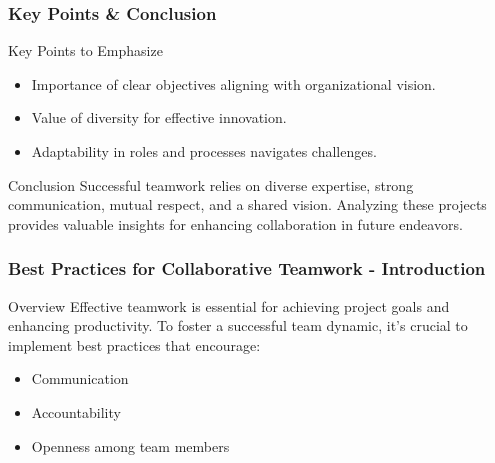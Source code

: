 \documentclass[aspectratio=169]{beamer}
\begin{document}
\begin{frame}[fragile]
    \frametitle{Key Points & Conclusion}
    \begin{block}{Key Points to Emphasize}
        \begin{itemize}
            \item Importance of clear objectives aligning with organizational vision.
            \item Value of diversity for effective innovation.
            \item Adaptability in roles and processes navigates challenges.
        \end{itemize}
    \end{block}

    \begin{block}{Conclusion}
        Successful teamwork relies on diverse expertise, strong communication, mutual respect, and a shared vision. Analyzing these projects provides valuable insights for enhancing collaboration in future endeavors.
    \end{block}
\end{frame}

\begin{frame}[fragile]
    \frametitle{Best Practices for Collaborative Teamwork - Introduction}
    \begin{block}{Overview}
        Effective teamwork is essential for achieving project goals and enhancing productivity. To foster a successful team dynamic, it's crucial to implement best practices that encourage:
    \end{block}
    \begin{itemize}
        \item Communication
        \item Accountability
        \item Openness among team members
    \end{itemize}
\end{frame}
\end{document}
